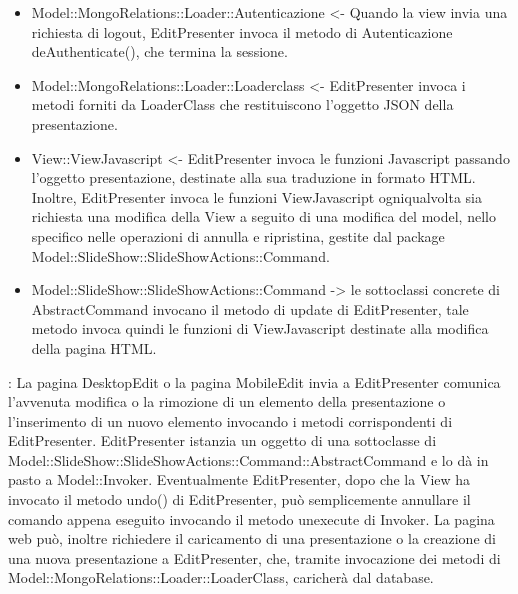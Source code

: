 {{\begin{itemize}
			\item Model::MongoRelations::Loader::Autenticazione <- Quando la view invia una richiesta di logout, EditPresenter invoca il metodo di Autenticazione deAuthenticate(), che termina la sessione.
			\item Model::MongoRelations::Loader::Loaderclass <- EditPresenter invoca i metodi forniti da LoaderClass che restituiscono l'oggetto JSON della presentazione. 
			\item View::ViewJavascript <- EditPresenter invoca le funzioni Javascript passando l'oggetto presentazione, destinate alla sua traduzione in formato HTML. Inoltre, EditPresenter invoca le funzioni ViewJavascript ogniqualvolta sia richiesta una modifica della View a seguito di una modifica del model, nello specifico nelle operazioni di annulla e ripristina, gestite dal package Model::SlideShow::SlideShowActions::Command.
			\item Model::SlideShow::SlideShowActions::Command -> le sottoclassi concrete di AbstractCommand invocano il metodo di update di EditPresenter, tale metodo invoca quindi le funzioni di ViewJavascript destinate alla modifica della pagina HTML.
		\end{itemize} 
		\textbf{\interfacce}: La pagina DesktopEdit o la pagina MobileEdit invia a EditPresenter comunica l’avvenuta modifica o la rimozione di un elemento della presentazione o l’inserimento di un nuovo elemento invocando i metodi corrispondenti di EditPresenter. EditPresenter istanzia un oggetto di una sottoclasse di Model::SlideShow::SlideShowActions::Command::AbstractCommand e lo dà in pasto a Model::Invoker. Eventualmente EditPresenter, dopo che la View ha invocato il metodo undo() di EditPresenter, può semplicemente annullare il comando appena eseguito invocando il metodo unexecute di Invoker.
		La pagina web può, inoltre richiedere il caricamento di una presentazione o la creazione di una nuova presentazione a EditPresenter, che, tramite invocazione dei metodi di Model::MongoRelations::Loader::LoaderClass, caricherà dal database.
		\\
	}
}
